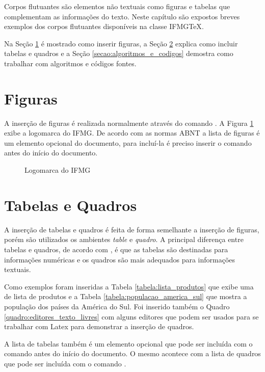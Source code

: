 Corpos flutuantes são elementos não textuais como figuras e tabelas que complementam as informações do texto. Neste capítulo são expostos breves exemplos dos corpos flutuantes disponíveis na classe {IFMG\TeX}.

Na Seção \ref{secao:figuras} é mostrado como inserir figuras, a Seção \ref{secao:tabelas_e_quadros} explica como incluir tabelas e quadros e a Seção \ref{secao:algoritmos_e_codigos} demostra como trabalhar com algoritmos e códigos fontes.

\section{Figuras}
\label{secao:figuras}

A inserção de figuras é realizada normalmente através do comando . A Figura \ref{figura:logomarca_ifmg} exibe a logomarca do IFMG. De acordo com as normas ABNT a lista de figuras é um elemento opcional do documento, para incluí-la é preciso inserir o comando  antes do início do documento.

\begin{figure}[htb]
 \centering
 \iflogo
 \caption{Logomarca do IFMG}
 \label{figura:logomarca_ifmg}
\end{figure}

\section{Tabelas e Quadros}
\label{secao:tabelas_e_quadros}

A inserção de tabelas e quadros é feita de forma semelhante a inserção de figuras, porém são utilizados os ambientes \textit{table} e \textit{quadro}. A principal diferença entre tabelas e quadros, de acordo com \citet{castro:2016:manual}, é que as tabelas são destinadas para informações numéricas e os quadros são mais adequados para informações textuais.

Como exemplos foram inseridas a Tabela \ref{tabela:lista_produtos} que exibe uma de lista de produtos e a Tabela \ref{tabela:populacao_america_sul} que mostra a população dos países da América do Sul. Foi inserido também o Quadro \ref{quadro:editores_texto_livres} com alguns editores que podem ser usados para se trabalhar com Latex para demonstrar a inserção de quadros.

 A lista de tabelas também é um elemento opcional que pode ser incluída com o comando  antes do início do documento. O mesmo acontece com a lista de quadros que pode ser incluída com o comando .

